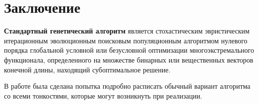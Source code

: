 \chapter*{Заключение}

\textbf{Стандартный генетический алгоритм} является стохастическим эвристическим итерационным эволюционным поисковым популяционным алгоритмом нулевого порядка глобальной условной или безусловной оптимизации многоэкстремального функционала, определенного на множестве бинарных или вещественных векторов конечной длины, находящий субоптимальное решение.

В работе была сделана попытка подробно расписать обычный вариант алгоритма со всеми тонкостями, которые могут возникнуть при реализации.

\clearpage